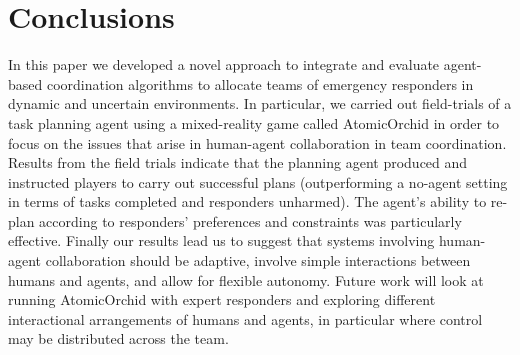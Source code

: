 \section{Conclusions}\label{sec:conclusions}
\noindent In this paper we developed a novel approach to integrate and evaluate agent-based coordination algorithms to allocate teams of emergency responders in dynamic and uncertain environments.  In particular, we carried out field-trials of a task planning agent using a mixed-reality game  called AtomicOrchid in order to focus on the issues that arise in human-agent collaboration in team coordination. Results from the field trials indicate that  the planning agent produced and instructed players to carry out successful plans (outperforming a no-agent setting in terms of tasks completed and responders unharmed). The agent's ability to re-plan  according to responders' preferences and constraints was particularly effective. Finally our results lead us to suggest that systems involving human-agent collaboration should be adaptive, involve simple  interactions between humans and agents, and allow for flexible autonomy. Future work will look at running AtomicOrchid with expert responders and  exploring different interactional arrangements of humans and agents, in particular where control may be distributed across the team.\vspace{-1mm}